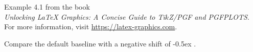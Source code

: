 \documentclass{article}
\begin{document}
Example 4.1 from the book\\
\emph{Unlocking LaTeX Graphics: A Concise Guide to Ti$k$Z/PGF and PGFPLOTS}.\\
For more information, visit \url{https://latex-graphics.com}.
\par\bigskip

Compare the default baseline
with a negative shift of -0.5ex
.
\end{document}

